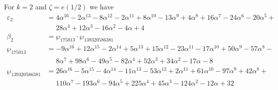 \documentclass[12pt]{amsart}
\theoremstyle{definition}
\def\a{\alpha}
\begin{document}
\noindent 
For $k=2$ and $\zeta=e(1/2)$ we have
{\small
\begin{align*}
\varepsilon_{2} &= 
4 \a^{16} - 2 \a^{13} - 8 \a^{12} - 2 \a^{11} + 8 \a^{10} - 13 \a^9 + 4 \a^8 + 16 \a^7 - 24 \a^6 - 20 \a^5 +
\\ & \quad\,\,
28 \a^4 + 12 \a^3 - 16 \a^2 - 4 \a + 4
\\
\beta_{2} &= \wp_{175013} \cdot \wp_{139320586381} \\
\wp_{175013} &=
-9 \a^{16} + 12 \a^{15} - 2 \a^{14} + 5 \a^{13} + 15 \a^{12} - 23 \a^{11} 
- 17 \a^{10} + 50 \a^9 - 57 \a^8 - 
\\ & \quad\,\,
8 \a^7 + 98 \a^6 - 49 \a^5 - 82 \a^4 + 52 \a^3 + 34 \a^2 - 17 \a - 8
\\
\wp_{139320586381} &=
26 \a^{16} - 5 \a^{15} - 4 \a^{14} - 11 \a^{13} - 53 \a^{12} + 2 \a^{11} 
+ 61 \a^{10} - 97 \a^9 + 42 \a^8 + 
\\ & \quad\,\,
110 \a^7 - 193 \a^6 - 94 \a^5 + 225 \a^4 + 45 \a^3 - 124 \a^2 - 12 \a + 32
\end{align*}
}



 

\end{document}
